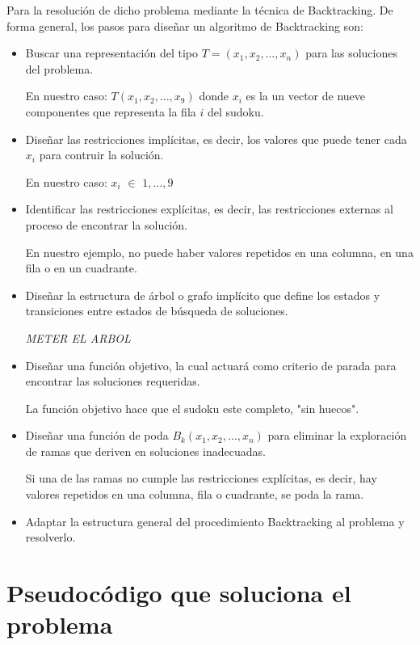 \documentclass[11pt, a4paper]{article}
\theoremstyle{theorem-style}
\theoremstyle{definition-style}
\theoremstyle{remark-style}
\theoremstyle{example-style}
\begin{document}
Para la resolución de dicho problema mediante la técnica de Backtracking. De forma general, los pasos para diseñar un algoritmo de Backtracking son:
\begin{itemize}
\item Buscar una representación del tipo $T=(x_1, x_2, \ldots, x_n)$ para las soluciones del problema.

En nuestro caso: $T(x_1, x_2, \dots, x_9)$ donde $x_i$ es la un vector de nueve componentes que representa la fila $i$ del sudoku.

\item Diseñar las restricciones implícitas, es decir, los valores que puede tener cada $x_i$ para contruir la solución.

En nuestro caso: $x_i$ $\in$ ${1, \dots, 9}$

\item Identificar las restricciones explícitas, es decir, las restricciones externas al proceso de encontrar la solución.

En nuestro ejemplo, no puede haber valores repetidos en una columna, en una fila o en un cuadrante.


\item Diseñar la estructura de árbol o grafo implícito que define los estados y transiciones entre estados de búsqueda de soluciones.

\textit{METER EL ARBOL}

\item Diseñar una función objetivo, la cual actuará como criterio de parada para encontrar las soluciones requeridas.

La función objetivo hace que el sudoku este completo, "sin huecos".


\item Diseñar una función de poda $B_k(x_1, x_2, \ldots, x_n)$ para eliminar la exploración de ramas que deriven en soluciones inadecuadas.

Si una de las ramas no cumple las restricciones explícitas, es decir, hay valores
repetidos en una columna, fila o cuadrante, se poda la rama.

\item Adaptar la estructura general del procedimiento Backtracking al problema y resolverlo.

\end{itemize}

\section{Pseudocódigo que soluciona el problema}
\end{document}
